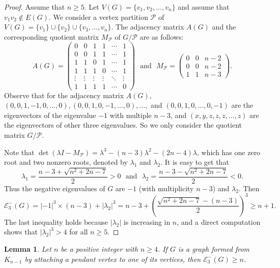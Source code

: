 \documentclass[a4paper,12pt]{article}
\theoremstyle{plain}
\newtheorem{lemma}[thm]{Lemma}
\begin{document}
\begin{proof}
Assume that $n\geq 5$. Let $V(G)=\{v_1, v_2, \ldots, v_n\}$ and assume that $v_1v_2\not\in E(G)$. We consider a vertex partition $\mathcal{P}$ of $V(G)=\{v_1\}\cup \{v_2\}\cup \{v_3, \ldots, v_n\}$. The adjacency matrix $A(G)$ and the corresponding quotient matrix $M_\mathcal{P}$ of $G/\mathcal{P}$ are as follows:
$$A(G)=
\begin{pmatrix}
0 & 0 & 1 & 1 & \cdots & 1 \\
0 & 0 & 1 & 1 & \cdots & 1 \\
1 & 1 & 0 & 1 & \cdots & 1 \\
1 & 1 & 1 & 0 & \cdots & 1 \\
\vdots & \vdots & \vdots & \vdots & \ddots & \vdots \\
1 & 1 & 1 & 1 & \cdots & 0
\end{pmatrix}
\text{~~and~~} M_\mathcal{P}=
\begin{pmatrix}
0 & 0 & n-2\\
0 & 0 & n-2\\
1 & 1 & n-3
\end{pmatrix}.$$
Observe that for the adjacency matrix $A(G)$, $(0,0,1,-1,0,\ldots,0), (0,0,1,0,-1,\ldots,0), \ldots,$ and $(0,0,1,0,\ldots,0,-1)$ are the eigenvectors of the eigenvalue $-1$ with multiple $n-3$, and $(x,y,z,z,z,\ldots,z)$ are the eigenvectors of other three eigenvalues. So we only consider the quotient matrix $G/\mathcal{P}$.

Note that $\det(\lambda I-M_\mathcal{P})=\lambda^3-(n-3)\lambda^2-(2n-4)\lambda$, which has one zero root and two nonzero roots, denoted by $\lambda_1$ and $\lambda_2$.
It is easy to get that 
$$\lambda_1=\frac{n-3+\sqrt{n^2+2n-7}}{2}>0 \text{~~and~~}
\lambda_2=\frac{n-3-\sqrt{n^2+2n-7}}{2}<0.$$
Thus the negative eigenvalues of $G$ are $-1$ (with multiplicity $n-3$) and $\lambda_2$. 
Then
$$\mathcal{E}_3^-(G)=|-1|^3\times (n-3)+|\lambda_2|^3=n-3+(\frac{\sqrt{n^2+2n-7}-(n-3)}{2})^3 \geq n+1.$$
The last inequality holds because $|\lambda_2|$ is increasing in $n$, and a direct computation shows that $|\lambda_2|^3 > 4$  for all $n \geq 5$.
\end{proof}



\begin{lemma}\label{lem:K_{n-1}+v}
Let $n$ be a positive integer with $n\geq 4$. If $G$ is a graph formed from $K_{n-1}$ by attaching a pendant vertex to one of its vertices, then $\mathcal{E}_3^{-}(G)\geq n$.
\end{lemma}
\end{document}
